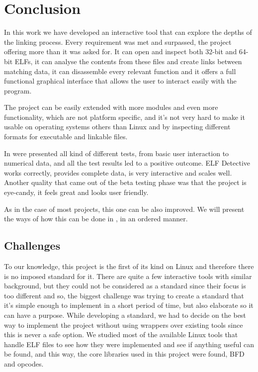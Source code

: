 
\chapter{Conclusion}
\label{chapter:conc}

In this work we have developed an interactive tool that can explore the depths of the linking process. Every requirement was met and surpassed, the project offering more than it was asked for. It can open and inspect both 32-{}bit and 64-{}bit ELFs, it can analyse the contents from these files and create links between matching data, it can disassemble every relevant function and it offers a full functional graphical interface that allows the user to interact easily with the program.

The project can be easily extended with more modules and even more functionality, which are not platform specific, and it's not very hard to make it usable on operating systems others than Linux and by inspecting different formats for executable and linkable files.

In  were presented all kind of different tests, from basic user interaction to numerical data, and all the test results led to a positive outcome. ELF Detective works correctly, provides complete data, is very interactive and scales well. Another quality that came out of the beta testing phase was that the project is eye-{}candy, it feels great and looks user friendly. 

As in the case of most projects, this one can be also improved. We will present the ways of how this can be done in , in an ordered manner.


\section{Challenges}
\label{sec:chal}

To our knowledge, this project is the first of its kind on Linux and therefore there is no imposed standard for it. There are quite a few interactive tools with similar background, but they could not be considered as a standard since their focus is too different and so, the biggest challenge was trying to create a standard that it's simple enough to implement in a short period of time, but also elaborate so it can have a purpose. While developing a standard, we had to decide on the best way to implement the project without using wrappers over existing tools since this is never a safe option. We studied most of the available Linux tools that handle ELF files to see how they were implemented and see if anything useful can be found, and this way, the core libraries used in this project were found, BFD and opcodes.


